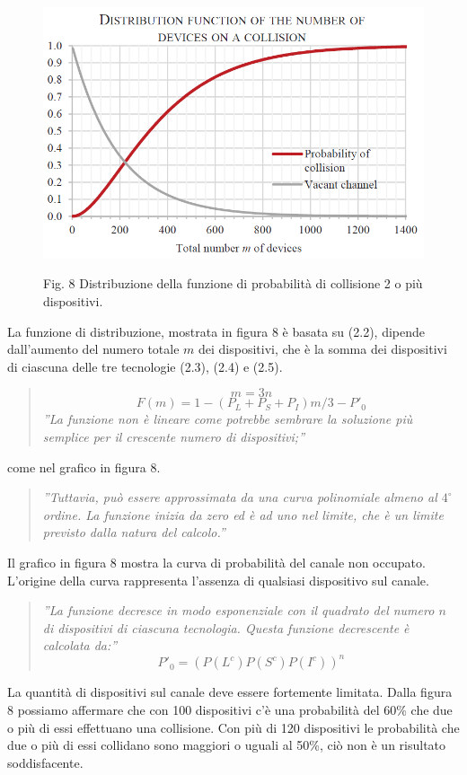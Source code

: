 \documentclass[a4paper]{report} %
\begin{document}
\begin{figure}
	\centering
	\includegraphics[scale=.5]{Immagini/DistribuzioneDiProb.png}
	
	Fig. 8 Distribuzione della funzione di probabilità di collisione 2 o più dispositivi.
\end{figure}
La funzione di distribuzione, mostrata in figura 8 è basata su (2.2), dipende dall'aumento del numero totale $m$ dei dispositivi, che è la somma dei dispositivi di ciascuna delle tre tecnologie (2.3), (2.4) e (2.5).
\begin{quote}
	\begin{equation}
	m = 3n \label{m3n}
	\end{equation}
	\begin{equation}
	F(m) = 1 - (P_L+P_S+P_I)m/3 - P'_0 
	\end{equation}
	\textit{''La funzione non è lineare come potrebbe sembrare la soluzione più semplice per il crescente numero di dispositivi;''}
\end{quote}
come nel grafico in figura 8. 
\begin{quote}
	\textit{''Tuttavia, può essere approssimata da una curva polinomiale almeno al $4^{\circ}$ ordine. La funzione inizia da zero ed è ad uno nel limite, che è un limite previsto dalla natura del calcolo.''} 
\end{quote}
Il grafico in figura 8 mostra la curva di probabilità del canale non occupato. L'origine della curva rappresenta l'assenza di qualsiasi dispositivo sul canale. 
\begin{quote}
	\textit{''La funzione decresce in modo esponenziale con il quadrato del numero $n$ di dispositivi di ciascuna tecnologia. Questa funzione decrescente è calcolata da:''}
	\begin{equation}
	P'_0 = (P(L^c)P(S^c)P(I^c))^n 
	\end{equation}
\end{quote}
La quantità di dispositivi sul canale deve essere fortemente limitata. Dalla figura 8 possiamo affermare che con 100 dispositivi c'è una probabilità del 60\% che due o più di essi effettuano una collisione. Con più di 120 dispositivi le probabilità che due o più di essi collidano sono maggiori o uguali al 50\%, ciò non è un risultato soddisfacente.
\end{document}
